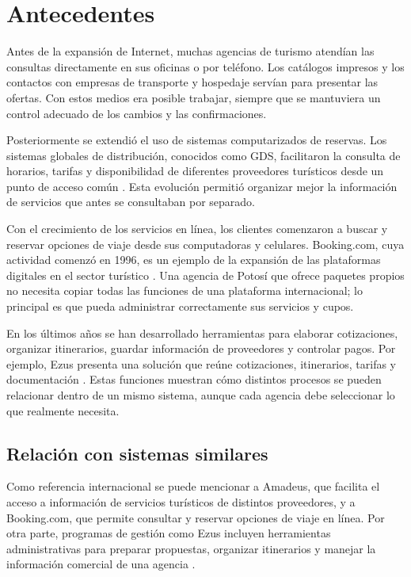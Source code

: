 \chapter{Antecedentes}
\label{cap:antecedentes}

Antes de la expansión de Internet, muchas agencias de turismo atendían las
consultas directamente en sus oficinas o por teléfono. Los catálogos
impresos y los contactos con empresas de transporte y hospedaje servían para
presentar las ofertas. Con estos medios era posible trabajar, siempre que se
mantuviera un control adecuado de los cambios y las confirmaciones.

Posteriormente se extendió el uso de sistemas computarizados de reservas. Los
sistemas globales de distribución, conocidos como GDS, facilitaron la
consulta de horarios, tarifas y disponibilidad de diferentes proveedores
turísticos desde un punto de acceso común \parencite{amadeusGDS}. Esta
evolución permitió organizar mejor la información de servicios que antes se
consultaban por separado.

Con el crecimiento de los servicios en línea, los clientes comenzaron a
buscar y reservar opciones de viaje desde sus computadoras y celulares.
Booking.com, cuya actividad comenzó en 1996, es un ejemplo de la expansión de
las plataformas digitales en el sector turístico \parencite{booking}. Una
agencia de Potosí que ofrece paquetes propios no necesita copiar todas las
funciones de una plataforma internacional; lo principal es que pueda
administrar correctamente sus servicios y cupos.

En los últimos años se han desarrollado herramientas para elaborar
cotizaciones, organizar itinerarios, guardar información de proveedores y
controlar pagos. Por ejemplo, Ezus presenta una solución que reúne
cotizaciones, itinerarios, tarifas y documentación \parencite{ezus}. Estas
funciones muestran cómo distintos procesos se pueden relacionar dentro de un
mismo sistema, aunque cada agencia debe seleccionar lo que realmente
necesita.

\section{Relación con sistemas similares}

Como referencia internacional se puede mencionar a Amadeus, que facilita el
acceso a información de servicios turísticos de distintos proveedores, y a
Booking.com, que permite consultar y reservar opciones de viaje en línea. Por
otra parte, programas de gestión como Ezus incluyen herramientas
administrativas para preparar propuestas, organizar itinerarios y manejar la
información comercial de una agencia \parencite{amadeusGDS,booking,ezus}.

